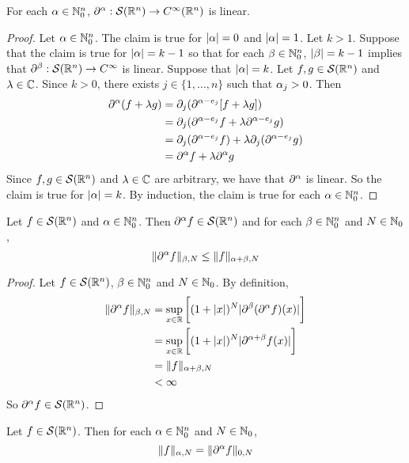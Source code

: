 \documentclass{book}
\begin{document}
	\begin{ex}
		For each $\alpha \in \mathbb{N}_0^n$, $\partial^{\alpha}: \mathcal{S}(\mathbb{R}^n) \rightarrow C^{\infty}(\mathbb{R}^n)$ is linear. 
	\end{ex}
	
	\begin{proof}
		Let $\alpha \in \mathbb{N}_0^n$. The claim is true for $|\alpha| = 0$ and $|\alpha| = 1$. Let $k > 1$. Suppose that the claim is true for $|\alpha| = k-1$ so that for each $\beta \in \mathbb{N}_0^n$, $|\beta| = k-1$ implies that $\partial^{\beta}: \mathcal{S}(\mathbb{R}^n) \rightarrow C^{\infty}$ is linear. Suppose that $|\alpha| = k$. Let $f, g \in \mathcal{S}(\mathbb{R}^n)$ and $\lambda \in \mathbb{C}$. Since $k > 0$, there exists $j \in \{1, \ldots, n\}$ such that $\alpha_j > 0$. Then 
		\begin{align*}
			\partial^{\alpha}(f + \lambda g) 
			& = \partial_j(\partial^{\alpha - e_j} [f + \lambda g]) \\
			& =  \partial_j(\partial^{\alpha - e_j}f + \lambda \partial^{\alpha - e_j} g) \\
			& = \partial_j(\partial^{\alpha - e_j}f ) + \lambda \partial_j (\partial^{\alpha - e_j} g) \\
			& = \partial^{\alpha} f + \lambda \partial^{\alpha} g
		\end{align*} 
		Since $f, g \in \mathcal{S}(\mathbb{R}^n)$ and $\lambda \in \mathbb{C}$ are arbitrary, we have that $\partial^{\alpha}$ is linear. So the claim is true for $|\alpha| = k$. By induction, the claim is true for each $\alpha \in \mathbb{N}_0^n$.
	\end{proof}
	
	\begin{ex}
		Let $f \in \mathcal{S}(\mathbb{R}^n)$ and $\alpha \in \mathbb{N}_0^n$. Then $\partial^{\alpha}f \in \mathcal{S}(\mathbb{R}^n)$ and for each $\beta \in \mathbb{N}_0^n$ and $N \in \mathbb{N}_0$, 
		$$\|\partial^{\alpha} f \|_{\beta, N} \leq \|f \|_{\alpha + \beta, N}$$ 
	\end{ex}
	
	\begin{proof}
		Let $f \in \mathcal{S}(\mathbb{R}^n)$, $\beta \in \mathbb{N}_0^n$ and $N \in \mathbb{N}_0$. By definition, 
		\begin{align*}
			\|\partial^{\alpha} f \|_{\beta, N}
			& = \sup_{x \in \mathbb{R}} \bigg[ (1 + |x|)^N |\partial^{\beta} (\partial^{\alpha} f) (x)| \bigg] \\
			&= \sup_{x \in \mathbb{R}} \bigg[ (1 + |x|)^N |\partial^{\alpha + \beta}f (x)| \bigg] \\
			& = \|f \|_{\alpha + \beta, N} \\
			& < \infty
		\end{align*}
		So $\partial^{\alpha}f \in \mathcal{S}(\mathbb{R}^n)$.
	\end{proof}
	
	\begin{ex}
		Let $f \in \mathcal{S}(\mathbb{R}^n)$. Then for each $\alpha\in \mathbb{N}_0^n$ and $N \in \mathbb{N}_0$, 
		$$\|f\|_{\alpha, N} = \|\partial^{\alpha} f\|_{0, N}$$
	\end{ex}
	
\end{document}
